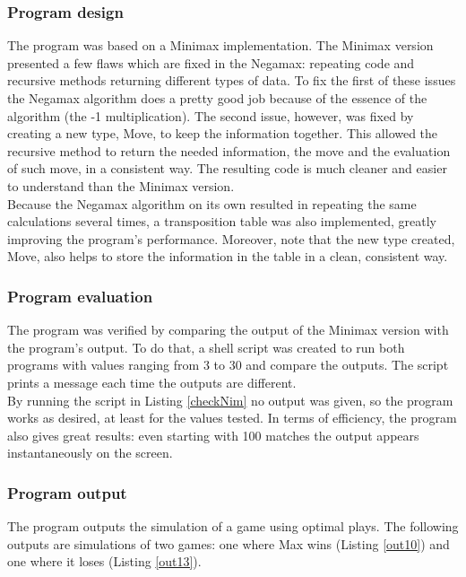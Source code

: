 \documentclass{article}
\begin{document}
\subsubsection*{Program design}
The program was based on a Minimax implementation. The Minimax version presented a few flaws which are fixed in the Negamax: repeating code and recursive methods returning different types of data. To fix the first of these issues the Negamax algorithm does a pretty good job because of the essence of the algorithm (the -1 multiplication). The second issue, however, was fixed by creating a new type, Move, to keep the information together. This allowed the recursive method to return the needed information, the move and the evaluation of such move, in a consistent way. The resulting code is much cleaner and easier to understand than the Minimax version.\\
Because the Negamax algorithm on its own resulted in repeating the same calculations several times, a transposition table was also implemented, greatly improving the program's performance. Moreover, note that the new type created, Move, also helps to store the information in the table in a clean, consistent way.


\subsubsection*{Program evaluation}

The program was verified by comparing the output of the Minimax version with the program's output. To do that, a shell script was created to run both programs with values ranging from 3 to 30 and compare the outputs. The script prints a message each time the outputs are different.\\
By running the script in Listing \ref{checkNim} no output was given, so the program works as desired, at least for the values tested. In terms of efficiency, the program also gives great results: even starting with 100 matches the output appears instantaneously on the screen.




\subsubsection*{Program output}

The program outputs the simulation of a game using optimal plays. The following outputs are simulations of two games: one where Max wins (Listing \ref{out10}) and one where it loses (Listing \ref{out13}).
\end{document}
